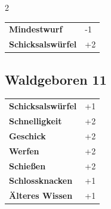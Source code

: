 \begin{multicols}{2}
\begin{tcolorbox}
\begin{tabular}{@{}ll@{}}
    \textbf{Mindestwurf} & -1\\
    \textbf{Schicksalswürfel} & +2\\
\end{tabular}


\end{tcolorbox}

\begin{tcolorbox}
    \subsection*{Waldgeboren \hfill \small{11 }}
    \tcblower




\begin{tabular}{@{}ll@{}}
    \textbf{Schicksalswürfel} & +1\\
    \textbf{Schnelligkeit} & +2\\
    \textbf{Geschick} & +2\\
    \textbf{Werfen} & +2\\
    \textbf{Schießen} & +2\\
    \textbf{Schlossknacken} & +1\\
    \textbf{Älteres Wissen} & +1\\
\end{tabular}


\end{tcolorbox}

\end{multicols}